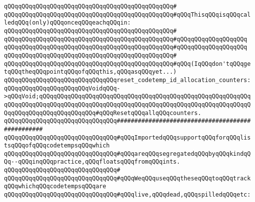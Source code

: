 \verb|qQQqqQQqqQQqqQQqqQQqqQQqqQQqqQQqqQQqqQQqqQQqqQQq#|\newline
\verb|qQQqqQQqqQQqqQQqqQQqqQQqqQQqqQQqqQQqqQQqqQQqqQQq#qQQqThisqQQqisqQQqcalledqQQq(only)qQQqonceqQQqeachqQQqin:|\newline
\verb|qQQqqQQqqQQqqQQqqQQqqQQqqQQqqQQqqQQqqQQqqQQqqQQq#|\newline
\verb|qQQqqQQqqQQqqQQqqQQqqQQqqQQqqQQqqQQqqQQqqQQqqQQq#qQQqqQQqqQQqqQQqqQQq|\newline
\verb|qQQqqQQqqQQqqQQqqQQqqQQqqQQqqQQqqQQqqQQqqQQqqQQq#qQQqqQQqqQQqqQQqqQQq|\newline
\verb|qQQqqQQqqQQqqQQqqQQqqQQqqQQqqQQqqQQqqQQqqQQqqQQq#|\newline
\verb|qQQqqQQqqQQqqQQqqQQqqQQqqQQqqQQqqQQqqQQqqQQqqQQq#qQQq(IqQQqdon'tqQQqgetqQQqtheqQQqpointqQQqofqQQqthis,qQQqasqQQqyet...)|\newline
\newline
\verb|qQQqqQQqqQQqqQQqqQQqqQQqqQQqqQQqreset_codetemp_id_allocation_counters:qQQqqQQqqQQqqQQqqQQqqQQqVoidqQQq->qQQqVoid;qQQqqQQqqQQqqQQqqQQqqQQqqQQqqQQqqQQqqQQqqQQqqQQqqQQqqQQqqQQqqQQqqQQqqQQqqQQqqQQqqQQqqQQqqQQqqQQqqQQqqQQqqQQqqQQqqQQqqQQqqQQqqQQqqQQqqQQqqQQqqQQqqQQqqQQqqQQq#qQQqResetqQQqallqQQqcounters.|\newline
\newline
\newline
\newline
\verb|qQQqqQQqqQQqqQQqqQQqqQQqqQQqqQQq#################################################|\newline
\verb|qQQqqQQqqQQqqQQqqQQqqQQqqQQqqQQq#qQQqImportedqQQqsupportqQQqforqQQqlistsqQQqofqQQqcodetempsqQQqwhich|\newline
\verb|qQQqqQQqqQQqqQQqqQQqqQQqqQQqqQQq#qQQqareqQQqsegregatedqQQqbyqQQqkindqQQq--qQQqinqQQqpractice,qQQqfloatsqQQqfromqQQqints.|\newline
\verb|qQQqqQQqqQQqqQQqqQQqqQQqqQQqqQQq#|\newline
\verb|qQQqqQQqqQQqqQQqqQQqqQQqqQQqqQQq#qQQqWeqQQquseqQQqtheseqQQqtoqQQqtrackqQQqwhichqQQqcodetempsqQQqare|\newline
\verb|qQQqqQQqqQQqqQQqqQQqqQQqqQQqqQQq#qQQqlive,qQQqdead,qQQqspilledqQQqetc:|\newline
\newline
